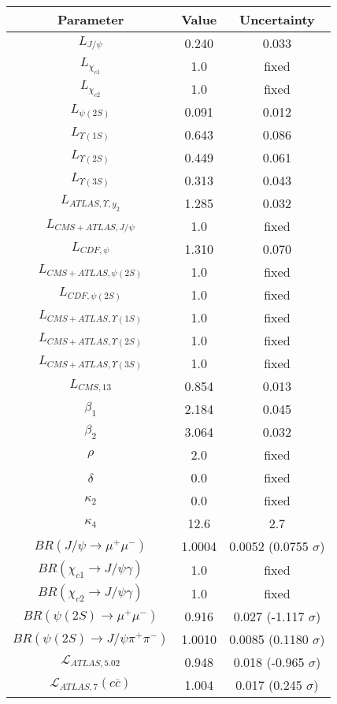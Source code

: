 \begin{table}[h!]
\centering
\begin{tabular}{c|c|c}
Parameter & Value & Uncertainty \\
\hline
$L_{J/\psi}$ & 0.240 & 0.033 \\
$L_{\chi_{c1}}$ & 1.0 & fixed \\
$L_{\chi_{c2}}$ & 1.0 & fixed \\
$L_{\psi(2S)}$ & 0.091 & 0.012 \\
$L_{\Upsilon(1S)}$ & 0.643 & 0.086 \\
$L_{\Upsilon(2S)}$ & 0.449 & 0.061 \\
$L_{\Upsilon(3S)}$ & 0.313 & 0.043 \\
$L_{ATLAS,\Upsilon,y_2}$ & 1.285 & 0.032 \\
$L_{CMS+ATLAS,J/\psi}$ & 1.0 & fixed \\
$L_{CDF,\psi}$ & 1.310 & 0.070 \\
$L_{CMS+ATLAS,\psi(2S)}$ & 1.0 & fixed \\
$L_{CDF,\psi(2S)}$ & 1.0 & fixed \\
$L_{CMS+ATLAS,\Upsilon(1S)}$ & 1.0 & fixed \\
$L_{CMS+ATLAS,\Upsilon(2S)}$ & 1.0 & fixed \\
$L_{CMS+ATLAS,\Upsilon(3S)}$ & 1.0 & fixed \\
$L_{CMS,13}$ & 0.854 & 0.013 \\
$\beta_1$ & 2.184 & 0.045 \\
$\beta_2$ & 3.064 & 0.032 \\
$\rho$ & 2.0 & fixed \\
$\delta$ & 0.0 & fixed \\
$\kappa_2$ & 0.0 & fixed \\
$\kappa_4$ & 12.6 & 2.7 \\
$BR(J/\psi\rightarrow\mu^+\mu^-)$ & 1.0004 & 0.0052 (0.0755 $\sigma$) \\
$BR(\chi_{c1}\rightarrow J/\psi\gamma)$ & 1.0 & fixed \\
$BR(\chi_{c2}\rightarrow J/\psi\gamma)$ & 1.0 & fixed \\
$BR(\psi(2S)\rightarrow\mu^+\mu^-)$ & 0.916 & 0.027 (-1.117 $\sigma$) \\
$BR(\psi(2S)\rightarrow J/\psi\pi^+\pi^-)$ & 1.0010 & 0.0085 (0.1180 $\sigma$) \\
$\mathcal L_{ATLAS,5.02}$ & 0.948 & 0.018 (-0.965 $\sigma$) \\
$\mathcal L_{ATLAS,7}(c\overline c)$ & 1.004 & 0.017 (0.245 $\sigma$) \\

\end{tabular}
\end{table}
